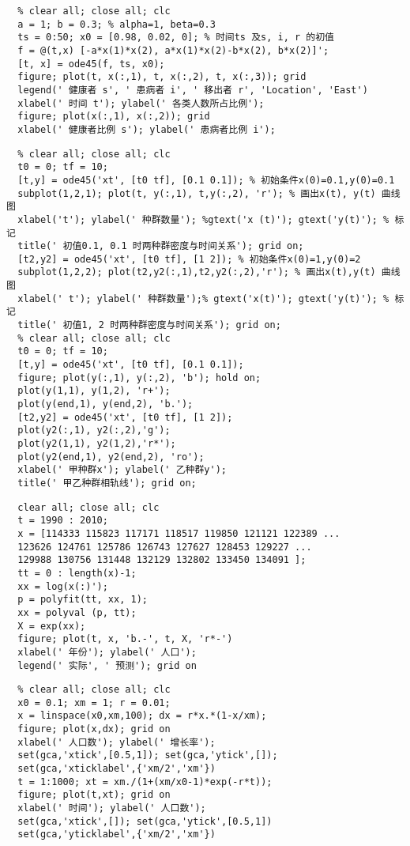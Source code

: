 \documentclass[oneside]{ctexart}
\begin{document}
\begin{lstlisting}
  % clear all; close all; clc
  a = 1; b = 0.3; % alpha=1, beta=0.3
  ts = 0:50; x0 = [0.98, 0.02, 0]; % 时间ts 及s, i, r 的初值
  f = @(t,x) [-a*x(1)*x(2), a*x(1)*x(2)-b*x(2), b*x(2)]';
  [t, x] = ode45(f, ts, x0);
  figure; plot(t, x(:,1), t, x(:,2), t, x(:,3)); grid
  legend(' 健康者 s', ' 患病者 i', ' 移出者 r', 'Location', 'East')
  xlabel(' 时间 t'); ylabel(' 各类人数所占比例');
  figure; plot(x(:,1), x(:,2)); grid
  xlabel(' 健康者比例 s'); ylabel(' 患病者比例 i');
\end{lstlisting}
\begin{lstlisting}
  % clear all; close all; clc
  t0 = 0; tf = 10;
  [t,y] = ode45('xt', [t0 tf], [0.1 0.1]); % 初始条件x(0)=0.1,y(0)=0.1
  subplot(1,2,1); plot(t, y(:,1), t,y(:,2), 'r'); % 画出x(t), y(t) 曲线图
  xlabel('t'); ylabel(' 种群数量'); %gtext('x (t)'); gtext('y(t)'); % 标记
  title(' 初值0.1, 0.1 时两种群密度与时间关系'); grid on;
  [t2,y2] = ode45('xt', [t0 tf], [1 2]); % 初始条件x(0)=1,y(0)=2
  subplot(1,2,2); plot(t2,y2(:,1),t2,y2(:,2),'r'); % 画出x(t),y(t) 曲线图
  xlabel(' t'); ylabel(' 种群数量');% gtext('x(t)'); gtext('y(t)'); % 标记
  title(' 初值1, 2 时两种群密度与时间关系'); grid on;
  % clear all; close all; clc
  t0 = 0; tf = 10;
  [t,y] = ode45('xt', [t0 tf], [0.1 0.1]);
  figure; plot(y(:,1), y(:,2), 'b'); hold on;
  plot(y(1,1), y(1,2), 'r+');
  plot(y(end,1), y(end,2), 'b.');
  [t2,y2] = ode45('xt', [t0 tf], [1 2]);
  plot(y2(:,1), y2(:,2),'g');
  plot(y2(1,1), y2(1,2),'r*');
  plot(y2(end,1), y2(end,2), 'ro');
  xlabel(' 甲种群x'); ylabel(' 乙种群y');
  title(' 甲乙种群相轨线'); grid on;
\end{lstlisting}
\begin{lstlisting}
  clear all; close all; clc
  t = 1990 : 2010;
  x = [114333 115823 117171 118517 119850 121121 122389 ...
  123626 124761 125786 126743 127627 128453 129227 ...
  129988 130756 131448 132129 132802 133450 134091 ];
  tt = 0 : length(x)-1;
  xx = log(x(:)');
  p = polyfit(tt, xx, 1);
  xx = polyval (p, tt);
  X = exp(xx);
  figure; plot(t, x, 'b.-', t, X, 'r*-')
  xlabel(' 年份'); ylabel(' 人口');
  legend(' 实际', ' 预测'); grid on
\end{lstlisting}
\begin{lstlisting}
  % clear all; close all; clc
  x0 = 0.1; xm = 1; r = 0.01;
  x = linspace(x0,xm,100); dx = r*x.*(1-x/xm);
  figure; plot(x,dx); grid on
  xlabel(' 人口数'); ylabel(' 增长率');
  set(gca,'xtick',[0.5,1]); set(gca,'ytick',[]);
  set(gca,'xticklabel',{'xm/2','xm'})
  t = 1:1000; xt = xm./(1+(xm/x0-1)*exp(-r*t));
  figure; plot(t,xt); grid on
  xlabel(' 时间'); ylabel(' 人口数');
  set(gca,'xtick',[]); set(gca,'ytick',[0.5,1])
  set(gca,'yticklabel',{'xm/2','xm'})
\end{lstlisting}
\end{document}
